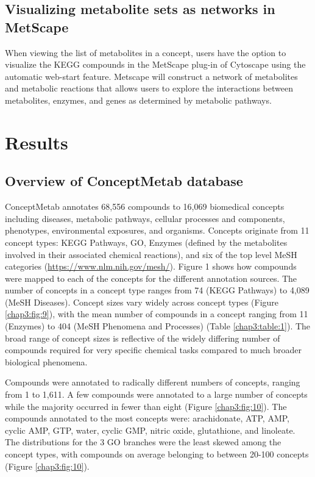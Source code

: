 \subsection{Visualizing metabolite sets as networks in MetScape}
\label{conceptmetab_methods_metscape}

When viewing the list of metabolites in a concept, users have the option to visualize the KEGG compounds in the MetScape plug-in of Cytoscape \cite{Karnovsky:2012cf} using the automatic web-start feature. Metscape will construct a network of metabolites and metabolic reactions that allows users to explore the interactions between metabolites, enzymes, and genes as determined by metabolic pathways.

\section{Results}
\label{conceptmetab_results}

\subsection{Overview of ConceptMetab database}
\label{conceptmetab_results_overview}

ConceptMetab annotates 68,556 compounds to 16,069 biomedical concepts including diseases, metabolic pathways, cellular processes and components, phenotypes, environmental exposures, and organisms. Concepts originate from 11 concept types: KEGG Pathways, GO, Enzymes (defined by the metabolites involved in their associated chemical reactions), and six of the top level MeSH categories (\url{https://www.nlm.nih.gov/mesh/}). Figure 1 shows how compounds were mapped to each of the concepts for the different annotation sources. The number of concepts in a concept type ranges from 74 (KEGG Pathways) to 4,089 (MeSH Diseases). Concept sizes vary widely across concept types (Figure \ref{chap3:fig:9}), with the mean number of compounds in a concept ranging from 11 (Enzymes) to 404 (MeSH Phenomena and Processes) (Table \ref{chap3:table:1}). The broad range of concept sizes is reflective of the widely differing number of compounds required for very specific chemical tasks compared to much broader biological phenomena.

Compounds were annotated to radically different numbers of concepts, ranging from 1 to 1,611. A few compounds were annotated to a large number of concepts while the majority occurred in fewer than eight (Figure \ref{chap3:fig:10}). The compounds annotated to the most concepts were: arachidonate, ATP, AMP, cyclic AMP, GTP, water, cyclic GMP, nitric oxide, glutathione, and linoleate. The distributions for the 3 GO branches were the least skewed among the concept types, with compounds on average belonging to between 20-100 concepts (Figure \ref{chap3:fig:10}).

